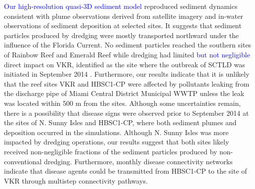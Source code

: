 \documentclass[preprint,12pt,authoryear]{elsarticle}
\newcommand{\modif}[1]{\textcolor{blue}{#1}}
\begin{document}
\modif{Our high-resolution quasi-3D sediment model} reproduced sediment dynamics consistent with plume observations derived from satellite imagery and in-water observations of sediment deposition at selected sites. It suggests that sediment particles produced by dredging were mostly transported northward under the influence of the Florida Current. No sediment particles reached the southern sites of Rainbow Reef and Emerald Reef while dredging had limited \modif{but not negligible} direct impact on VKR, identified as the site where the outbreak of SCTLD was initiated in September 2014 \citep{precht2016unprecedented}. Furthermore, our results indicate that it is unlikely that the reef sites VKR and HBSC1-CP were affected by pollutants leaking from the discharge pipe of Miami Central District Municipal WWTP unless the leak was located within 500 m from the sites. Although some uncertainties remain, there is a possibility that disease signs were observed prior to September 2014 at the sites of N. Sunny Isles and HBSC1-CP, where both sediment plumes and deposition occurred in the simulations. Although N. Sunny Isles was more impacted by dredging operations, our results suggest that both sites likely received non-negligible fractions of the sediment particles produced by non-conventional dredging. Furthermore, monthly disease connectivity networks indicate that disease agents could be transmitted from HBSC1-CP to the site of VKR through multistep connectivity pathways.   
\end{document}
